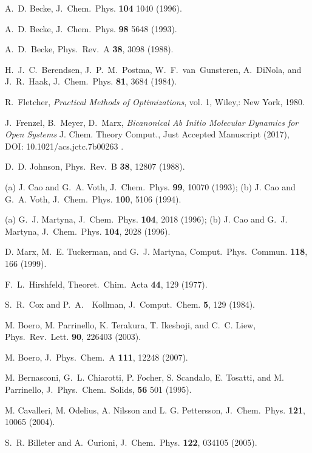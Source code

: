 \documentclass[twoside,10pt,titlepage,a4paper]{article}
\begin{document}
\begin{thebibliography}{999}
    A.~D. Becke, J.~Chem.~Phys. {\bf 104} 1040 (1996).

    A.~D. Becke, J.~Chem.~Phys. {\bf 98} 5648 (1993).

    A.~D.~Becke,
    Phys.~Rev.~A {\bf 38}, 3098 (1988).

    H.~J.~C.~Berendsen, J.~P.~M.~Postma, W.~F.~van~Gunsteren, 
    A.~DiNola, and J.~R.~Haak,
    J.~Chem.~Phys. {\bf 81}, 3684 (1984).

    R.~Fletcher,
    {\em Practical Methods of Optimizations}, vol. 1, 
    Wiley,: New York, 1980.

    J.~Frenzel, B.~Meyer, D.~Marx, 
    {\em Bicanonical Ab Initio Molecular Dynamics for Open Systems}
    J. Chem. Theory Comput., Just Accepted Manuscript 
    (2017), 
    DOI: 10.1021/acs.jctc.7b00263 .

    D.~D. Johnson, Phys.~Rev.~B {\bf 38}, 12807 (1988).

  (a) J. Cao and G.~A. Voth,
    J.~Chem.~Phys. {\bf 99}, 10070 (1993);
  (b) J. Cao and G.~A. Voth,
    J.~Chem.~Phys. {\bf 100}, 5106 (1994).

  (a) G.~J. Martyna,
    J.~Chem.~Phys. {\bf 104}, 2018 (1996);
  (b) J. Cao and G.~J. Martyna,
    J.~Chem.~Phys. {\bf 104}, 2028 (1996).

    D. Marx, M.~E. Tuckerman, and G.~J. Martyna,
    Comput.~Phys.~Commun. {\bf 118}, 166 (1999).

    F.~L.~Hirshfeld,
    Theoret.~Chim.~Acta {\bf 44}, 129 (1977).

    S.~R.~Cox and P.~A.~~Kollman,
    J.~Comput.~Chem. {\bf 5}, 129 (1984).

 M. Boero, M. Parrinello, K. Terakura, T. Ikeshoji, and C.~C. Liew,
     Phys.~Rev.~Lett. {\bf 90}, 226403 (2003).

 M. Boero, J.~Phys.~Chem.~A {\bf 111}, 12248 (2007).

    M. Bernasconi, G.~L. Chiarotti, P. Focher, S. Scandalo, E. Tosatti,
    and M. Parrinello, J.~Phys.~Chem.~Solids, {\bf 56} 501 (1995).

 M. Cavalleri, M. Odelius, A. Nilsson and L. G. Pettersson,
     J.~Chem.~Phys. {\bf 121}, 10065 (2004).

    S.~R. Billeter and A.~Curioni,
    J.~Chem.~Phys. {\bf 122}, 034105 (2005).


\end{thebibliography}
\end{document}

